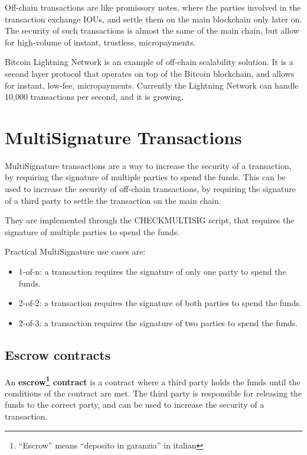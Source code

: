 Off-chain transactions are like promissory notes, where the parties involved in the transaction exchange IOUs, and settle them on the main blockchain only later on.
The security of such transactions is almost the same of the main chain, but allow for high-volume of instant, trustless, micropayments.

Bitcoin Lightning Network is an example of off-chain scalability solution. It is a second layer protocol that operates on top of the Bitcoin blockchain, and allows for instant, low-fee, micropayments.
Currently the Lightning Network can handle 10,000 transactions per second, and it is growing.

\section{MultiSignature Transactions}
MultiSignature transactions are a way to increase the security of a transaction, by requiring the signature of multiple parties to spend the funds. This can be used to increase the security of off-chain transactions, by requiring the signature of a third party to settle the transaction on the main chain.

They are implemented through the CHECKMULTISIG script, that requires the signature of multiple parties to spend the funds.

Practical MultiSignature use cases are:
\begin{itemize}
   \item 1-of-n: a transaction requires the signature of only one party to spend the funds.
   \item 2-of-2: a transaction requires the signature of both parties to spend the funds.
   \item 2-of-3: a transaction requires the signature of two parties to spend the funds.
\end{itemize}

\subsection{Escrow contracts}
An \textbf{escrow\footnote{``Escrow'' means ``deposito in garanzia'' in italian} contract} is a contract where a third party holds the funds until the conditions of the contract are met. The third party is responsible for releasing the funds to the correct party, and can be used to increase the security of a transaction.


